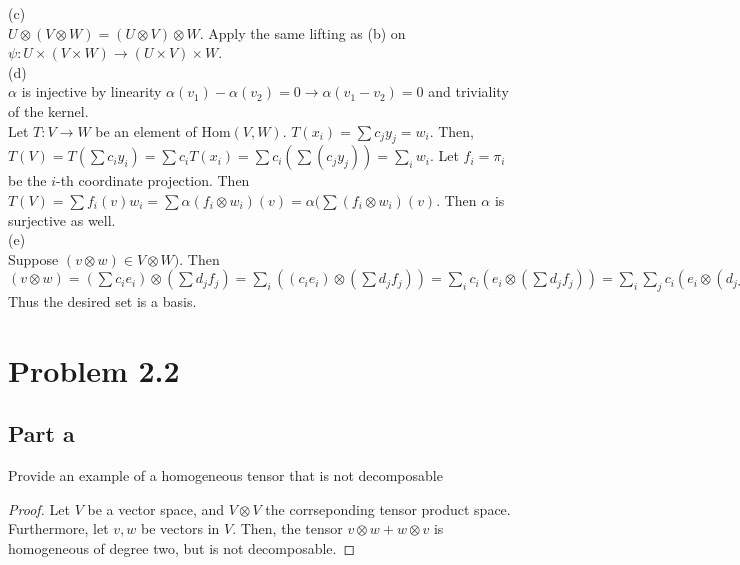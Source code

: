 \documentclass[paper=a4, fontsize=11pt]{scrartcl} %
\numberwithin{equation}{section} %
\numberwithin{figure}{section} %
\numberwithin{table}{section} %
\begin{document}
(c) \\

$U \otimes (V \otimes W) = (U \otimes V) \otimes W$. Apply the same lifting as (b) on $\psi: U \times (V \times W) \to (U \times V) \times W$.\\

(d) \\

$\alpha$ is injective by linearity $\alpha(v_1) - \alpha(v_2) = 0 \to \alpha(v_1 - v_2) = 0$ and triviality of the kernel. \\

Let $T: V \to W$ be an element of Hom$(V,W)$. $T(x_i) = \sum c_j y_j = w_i$. Then, $T(V) = T(\sum c_i y_i) = \sum c_i T(x_i)  = \sum c_i (\sum(c_j y_j))  = \sum_i w_i $. Let $f_i =  \pi_i$ be the $i$-th coordinate projection. Then $T(V) = \sum f_i(v) w_i = \sum\alpha(f_i \otimes w_i)(v) = \alpha(\sum(f_i \otimes w_i)(v).$ Then $\alpha$ is surjective as well. \\

(e) \\

Suppose $(v \otimes w) \in V \otimes W).$ Then $(v \otimes w) = (\sum c_i e_i) \otimes (\sum d_j f_j) = \sum_i((c_i e_i) \otimes (\sum d_j f_j)) =  \sum_ic_i (e_i \otimes (\sum d_j f_j)) =  \sum_i \sum_j c_i (e_i \otimes (d_j f_j)) = \sum_i \sum_j c_i d_j (e_i \otimes f_j).$ Thus the desired set is a basis.




\section*{Problem 2.2}
\subsection{Part a}

Provide an example of a homogeneous tensor that is not decomposable

\begin{proof}
Let $V$ be a vector space, and $V \otimes V$ the corrseponding tensor product space.
Furthermore, let $v, w$ be vectors in $V$.
Then, the tensor $v \otimes w + w \otimes v$ is homogeneous of degree two, but is not decomposable.
\end{proof}
\end{document}
